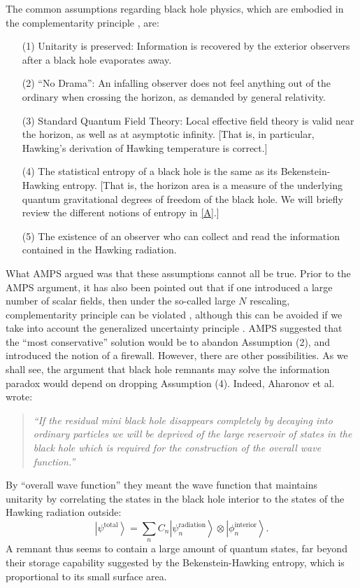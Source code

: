 \documentclass[12pt]{article}
\newcommand{\2}{$^2$}
\newcommand{\3}{$^3$}
\newcommand{\4}{$_4$}
\newcommand{\5}{$_5$}
\begin{document}
The common assumptions regarding black hole physics, which are embodied in the complementarity principle \cite{kn:stu}, are:
\begin{itemize}
\item[(1)] Unitarity is preserved: Information is recovered by the exterior observers after a black hole evaporates away.
\item[(2)] ``No Drama'': An infalling observer does not feel anything out of the ordinary when crossing the horizon, as demanded by general relativity.
\item[(3)] Standard Quantum Field Theory: Local effective field theory is valid near the horizon, as well as at asymptotic infinity. [That is, in particular, Hawking's derivation of Hawking temperature is correct.]
\item[(4)] The statistical entropy of a black hole is the same as its Bekenstein-Hawking entropy. [That is, the horizon area is a measure of the underlying quantum gravitational degrees of freedom of the black hole. We will briefly review the different notions of entropy in \ref{A}.] 
\item[(5)] The existence of an observer who can collect and read the information contained in the Hawking radiation.
 \end{itemize}
What AMPS argued was that these assumptions cannot all be true. Prior to the AMPS argument, it has also been pointed out that if one introduced a large number of scalar fields, then under the so-called large $N$ rescaling, complementarity principle can be violated \cite{Yeom:2008qw1,Yeom:2008qw0}, although this can be avoided if we take into account the generalized uncertainty principle \cite{COY}. AMPS suggested that the ``most conservative'' solution would be to abandon Assumption (2), and introduced the notion of a firewall. However, there are other possibilities. As we shall see, the argument that black hole remnants may solve the information paradox would depend on dropping Assumption (4). Indeed, Aharonov et al. \cite{ACN} wrote:
\begin{quote}
\emph{``If the residual mini black hole disappears completely by decaying into ordinary particles we will be deprived of the large reservoir of states in the black hole which is required for the construction of the overall wave function.''}
\end{quote}
By ``overall wave function'' they meant the wave function that maintains unitarity by correlating the states in the black hole interior to the states of the Hawking radiation outside:
\begin{equation}
\left|\psi^{\text{total}} \right\rangle = \sum_n C_n \left|\psi_n^{\text{radiation}} \right\rangle  \otimes \left|\phi_n^{\text{interior}}\right\rangle.
\end{equation}
A remnant thus seems to contain a large amount of quantum states, far beyond their storage capability suggested by the Bekenstein-Hawking entropy, which is proportional to its small surface area.
\end{document}
